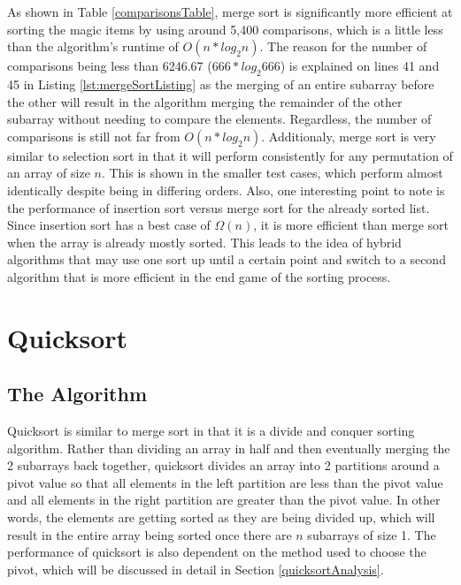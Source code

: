 \documentclass[letterpaper, 10pt,DIV=13]{scrartcl}
\numberwithin{equation}{section} %
\numberwithin{figure}{section} %
\numberwithin{table}{section} %
\begin{document}
As shown in Table \ref{comparisonsTable}, merge sort is significantly more efficient at sorting the magic items by using around 5,400 comparisons, which is a little less than the algorithm's runtime of $O(n * log_2n)$. The reason for the number of comparisons being less than 6246.67 ($666 * log_{2}666$) is explained on lines 41 and 45 in Listing \ref{lst:mergeSortListing} as the merging of an entire subarray before the other will result in the algorithm merging the remainder of the other subarray without needing to compare the elements. Regardless, the number of comparisons is still not far from $O(n * log_2n)$. Additionaly, merge sort is very similar to selection sort in that it will perform consistently for any permutation of an array of size $n$. This is shown in the smaller test cases, which perform almost identically despite being in differing orders. Also, one interesting point to note is the performance of insertion sort versus merge sort for the already sorted list. Since insertion sort has a best case of $\Omega(n)$, it is more efficient than merge sort when the array is already mostly sorted. This leads to the idea of hybrid algorithms that may use one sort up until a certain point and switch to a second algorithm that is more efficient in the end game of the sorting process.

\section{Quicksort}
\subsection{The Algorithm}\label{quicksortAlgo}
Quicksort is similar to merge sort in that it is a divide and conquer sorting algorithm. Rather than dividing an array in half and then eventually merging the 2 subarrays back together, quicksort divides an array into 2 partitions around a pivot value so that all elements in the left partition are less than the pivot value and all elements in the right partition are greater than the pivot value. In other words, the elements are getting sorted as they are being divided up, which will result in the entire array being sorted once there are $n$ subarrays of size 1. The performance of quicksort is also dependent on the method used to choose the pivot, which will be discussed in detail in Section \ref{quicksortAnalysis}.
\end{document}
